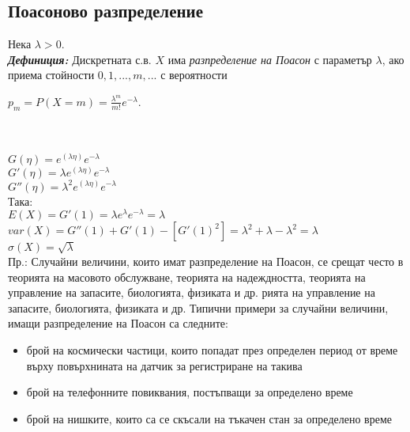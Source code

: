 \documentclass[11pt]{article} %
\newcommand{\italicBold}[1]{\textbf{\emph{#1}}}
\newcommand{\definition}{\italicBold{Дефиниция: }}
\begin{document}
\subsection{Поасоново разпределение}
Нека $\lambda > 0$.\\
\definition Дискретната с.в. $X$ има \textit{разпределение на Поасон} с параметър $\lambda$, ако приема стойности $0,1,...,m,...$ с вероятности\\
\centerline{$p_{m}=P(X=m)=\frac{\lambda^{m}}{m!}e^{-\lambda}$.}\\\\
$G(\eta)=e^{(\lambda\eta)}e^{-\lambda}$\\
$G'(\eta)=\lambda e^{(\lambda\eta)}e^{-\lambda}$\\
$G''(\eta)=\lambda^{2}e^{(\lambda\eta)}e^{-\lambda}$\\
Така:\\
$E(X)=G'(1)=\lambda e^{\lambda} e^{-\lambda}=\lambda$\\
$var(X)=G''(1)+G'(1)-[G'(1)^{2}]=\lambda^{2}+\lambda -\lambda^{2}=\lambda$\\
$\sigma(X)=\sqrt{\lambda}$\\

Пр.: Случайни величини, които имат разпределение на Поасон, се срещат често в теорията на масовото обслужване, теорията на надеждността, теорията на управление на запасите, биологията, физиката и др.
рията на управление на запасите, биологията, физиката и др.
Типични примери за случайни величини, имащи разпределение на
Поасон са следните:
\begin{itemize}
	\item брой на космически частици, които попадат през определен период от време върху повърхнината на датчик за регистриране на такива\\
	\item брой на телефонните повиквания, постъпващи за определено време\\
	\item брой на нишките, които са се скъсали на тъкачен стан за определено време
\end{itemize}
\end{document}
